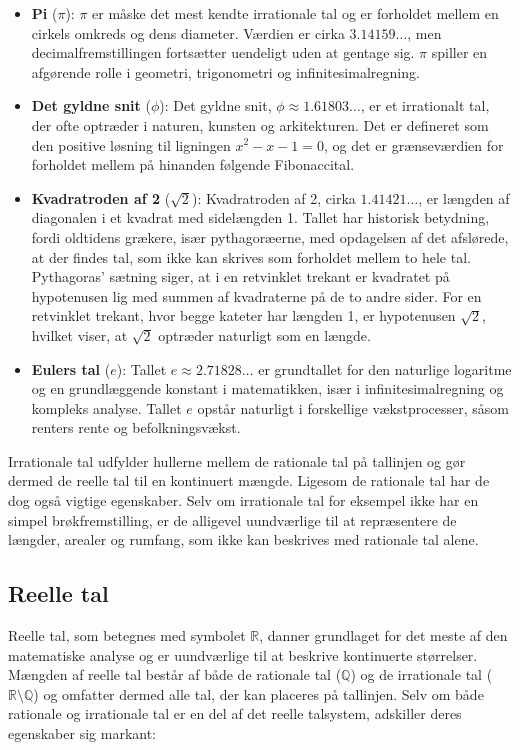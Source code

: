 \begin{itemize}
    \item \textbf{Pi} ($\pi$): $\pi$ er måske det mest kendte irrationale tal og er forholdet mellem en cirkels omkreds og dens diameter. Værdien er cirka $3.14159\ldots$, men decimalfremstillingen fortsætter uendeligt uden at gentage sig. $\pi$ spiller en afgørende rolle i geometri, trigonometri og infinitesimalregning.

    \item \textbf{Det gyldne snit} ($\phi$): Det gyldne snit, $\phi \approx 1.61803\ldots$, er et irrationalt tal, der ofte optræder i naturen, kunsten og arkitekturen. Det er defineret som den positive løsning til ligningen $x^2 - x - 1 = 0$, og det er grænseværdien for forholdet mellem på hinanden følgende Fibonaccital.

    \item \textbf{Kvadratroden af 2} ($\sqrt{2}$): Kvadratroden af 2, cirka $1.41421\ldots$, er længden af diagonalen i et kvadrat med sidelængden 1. Tallet har historisk betydning, fordi oldtidens grækere, især pythagoræerne, med opdagelsen af det afslørede, at der findes tal, som ikke kan skrives som forholdet mellem to hele tal. Pythagoras' sætning siger, at i en retvinklet trekant er kvadratet på hypotenusen lig med summen af kvadraterne på de to andre sider. For en retvinklet trekant, hvor begge kateter har længden 1, er hypotenusen $\sqrt{2}$, hvilket viser, at $\sqrt{2}$ optræder naturligt som en længde.

    \item \textbf{Eulers tal} ($e$): Tallet $e \approx 2.71828\ldots$ er grundtallet for den naturlige logaritme og en grundlæggende konstant i matematikken, især i infinitesimalregning og kompleks analyse. Tallet $e$ opstår naturligt i forskellige vækstprocesser, såsom renters rente og befolkningsvækst.
\end{itemize}

Irrationale tal udfylder hullerne mellem de rationale tal på tallinjen og gør dermed de reelle tal til en kontinuert mængde. Ligesom de rationale tal har de dog også vigtige egenskaber. Selv om irrationale tal for eksempel ikke har en simpel brøkfremstilling, er de alligevel uundværlige til at repræsentere de længder, arealer og rumfang, som ikke kan beskrives med rationale tal alene.

\subsection*{Reelle tal}
Reelle tal, som betegnes med symbolet $\mathbb{R}$, danner grundlaget for det meste af den matematiske analyse og er uundværlige til at beskrive kontinuerte størrelser. Mængden af reelle tal består af både de rationale tal ($\mathbb{Q}$) og de irrationale tal ($\mathbb{R} \setminus \mathbb{Q}$) og omfatter dermed alle tal, der kan placeres på tallinjen. Selv om både rationale og irrationale tal er en del af det reelle talsystem, adskiller deres egenskaber sig markant:

